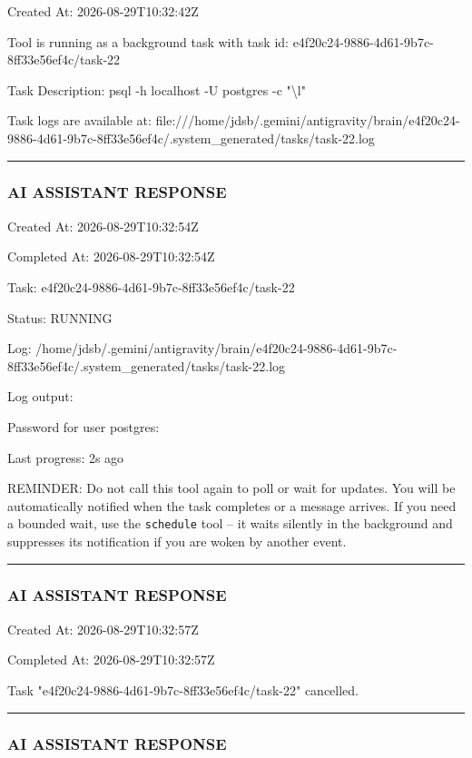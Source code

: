 \documentclass[11pt,a4paper]{article}
\begin{document}
Created At: 2026-08-29T10:32:42Z

Tool is running as a background task with task id: e4f20c24-9886-4d61-9b7c-8ff33e56ef4c/task-22

Task Description: psql -h localhost -U postgres -c "\textbackslash{}l"

Task logs are available at: file:///home/jdsb/.gemini/antigravity/brain/e4f20c24-9886-4d61-9b7c-8ff33e56ef4c/.system\_generated/tasks/task-22.log


\hrule

\subsubsection{AI ASSISTANT RESPONSE}

Created At: 2026-08-29T10:32:54Z

Completed At: 2026-08-29T10:32:54Z

Task: e4f20c24-9886-4d61-9b7c-8ff33e56ef4c/task-22

Status: RUNNING

Log: /home/jdsb/.gemini/antigravity/brain/e4f20c24-9886-4d61-9b7c-8ff33e56ef4c/.system\_generated/tasks/task-22.log

Log output:

Password for user postgres:


Last progress: 2s ago



REMINDER: Do not call this tool again to poll or wait for updates. You will be automatically notified when the task completes or a message arrives. If you need a bounded wait, use the \texttt{schedule} tool -- it waits silently in the background and suppresses its notification if you are woken by another event.


\hrule

\subsubsection{AI ASSISTANT RESPONSE}

Created At: 2026-08-29T10:32:57Z

Completed At: 2026-08-29T10:32:57Z

Task "e4f20c24-9886-4d61-9b7c-8ff33e56ef4c/task-22" cancelled.


\hrule

\subsubsection{AI ASSISTANT RESPONSE}
\end{document}
